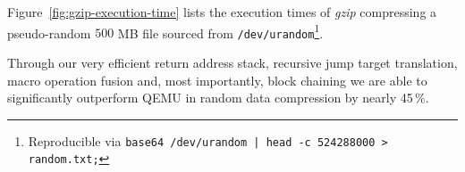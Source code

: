 Figure~\vref{fig:gzip-execution-time} lists the execution times of \textit{gzip} compressing a pseudo-random $500$ MB file sourced from \texttt{/dev/urandom}\footnote{Reproducible via \texttt{base64 /dev/urandom | head -c 524288000 > random.txt;}}.

Through our very efficient return address stack, recursive jump target translation, macro operation fusion and, most importantly, block chaining we are able to significantly outperform QEMU in random data compression by nearly 45\,\%.






















